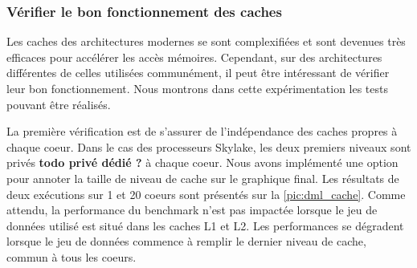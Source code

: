     
    
    

    \subsubsection{Vérifier le bon fonctionnement des caches} \label{sec:dml_cache_ok}
        Les caches des architectures modernes se sont complexifiées et sont devenues très efficaces pour accélérer les accès mémoires. Cependant, sur des architectures différentes de celles utilisées communément, il peut être intéressant de vérifier leur bon fonctionnement. Nous montrons dans cette expérimentation les tests pouvant être réalisés.
        
        La première vérification est de s'assurer de l'indépendance des caches propres à chaque coeur. Dans le cas des processeurs Skylake, les deux premiers niveaux sont privés \textbf{todo privé dédié ?} à chaque coeur. Nous avons implémenté une option pour annoter la taille de niveau de cache sur le graphique final. Les résultats de deux exécutions sur 1 et 20 coeurs sont présentés sur la \autoref{pic:dml_cache}. Comme attendu, la performance du benchmark n'est pas impactée lorsque le jeu de données utilisé est situé dans les caches L1 et L2. Les performances se dégradent lorsque le jeu de données commence à remplir le dernier niveau de cache, commun à tous les coeurs.
        
